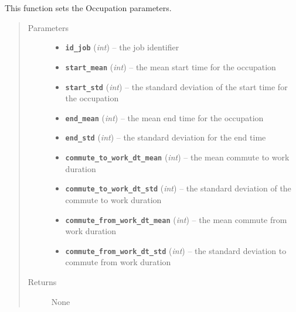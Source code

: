 \documentclass[letterpaper,10pt,english]{sphinxmanual}
\begin{document}
\begin{fulllineitems}

\begin{fulllineitems}
\label{occupation:occupation.Occupation.set_job_params}
This function sets the Occupation parameters.
\begin{quote}\begin{description}
\item[{Parameters}] \leavevmode\begin{itemize}
\item {} 
\textbf{\texttt{id\_job}} (\emph{int}) -- the job identifier

\item {} 
\textbf{\texttt{start\_mean}} (\emph{int}) -- the mean start time for the occupation

\item {} 
\textbf{\texttt{start\_std}} (\emph{int}) -- the standard deviation of the start time for the occupation

\item {} 
\textbf{\texttt{end\_mean}} (\emph{int}) -- the mean end time for the occupation

\item {} 
\textbf{\texttt{end\_std}} (\emph{int}) -- the standard deviation for the end time

\item {} 
\textbf{\texttt{commute\_to\_work\_dt\_mean}} (\emph{int}) -- the mean commute to work duration

\item {} 
\textbf{\texttt{commute\_to\_work\_dt\_std}} (\emph{int}) -- the standard deviation of the commute to work duration

\item {} 
\textbf{\texttt{commute\_from\_work\_dt\_mean}} (\emph{int}) -- the mean commute from work duration

\item {} 
\textbf{\texttt{commute\_from\_work\_dt\_std}} (\emph{int}) -- the standard deviation to commute from work duration

\end{itemize}

\item[{Returns}] \leavevmode
None


\end{description}
\end{quote}
\end{fulllineitems}
\end{fulllineitems}
\end{document}

